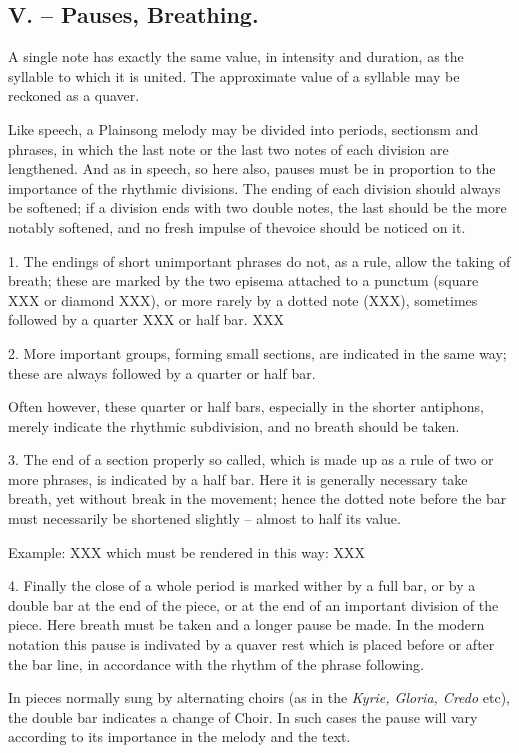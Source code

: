 \subsection{V. -- Pauses, Breathing.}

A single note has exactly the same value, in intensity and duration, as the syllable to which it is united. The approximate value of a syllable may be reckoned as a quaver.

Like speech, a Plainsong melody may be divided into periods, sectionsm and phrases, in which the last note or the last two notes of each division are lengthened. And as in speech, so here also, pauses must be in proportion to the importance of the rhythmic divisions. The ending of each division should always be softened; if a division ends with two double notes, the last should be the more notably softened, and no fresh impulse of thevoice should be noticed on it.

1. The endings of short unimportant phrases do not, as a rule, allow the taking of breath; these are marked by the two episema attached to a punctum (square XXX or diamond XXX), or more rarely by a dotted note (XXX), sometimes followed by a quarter XXX or half bar. XXX

2. More important groups, forming small sections, are indicated in the same way; these are always followed by a quarter or half bar.

Often however, these quarter or half bars, especially in the shorter antiphons, merely indicate the rhythmic subdivision, and no breath should be taken.

3. The end of a section properly so called, which is made up as a rule of two or more phrases, is indicated by a half bar. Here it is generally necessary take breath, yet without break in the movement; hence the dotted note before the bar must necessarily be shortened slightly -- almost to half its value.

Example:
XXX
which must be rendered in this way:
XXX

4. Finally the close of a whole period is marked wither by a full bar, or by a double bar at the end of the piece, or at the end of an important division of the piece. Here breath must be taken and a longer pause be made. In the modern notation this pause is indivated by a quaver rest which is placed before or after the bar line, in accordance with the rhythm of the phrase following.

In pieces normally sung by alternating choirs (as in the {\it Kyrie, Gloria, Credo} etc), the double bar indicates a change of Choir. In such cases the pause will vary according to its importance in the melody and the text.

